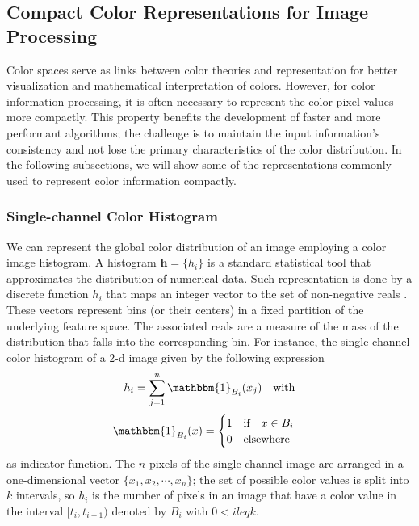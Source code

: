 \subsection{Compact Color Representations for Image Processing}

Color spaces serve as links between color theories and representation for better visualization and mathematical interpretation of colors. However, for color information processing, it is often necessary to represent the color pixel values more compactly. This property benefits the development of faster and more performant algorithms; the challenge is to maintain the input information's consistency and not lose the primary characteristics of the color distribution. In the following subsections, we will show some of the representations commonly used to represent color information compactly.

\subsubsection{Single-channel Color Histogram}
We can represent the global color distribution of an image employing a color image histogram. A histogram $\mathbf{h}= \{h_i\}$ is a standard statistical tool that approximates the distribution of numerical data. Such representation is done by a discrete function $h_i$ that maps an integer vector to the set of non-negative reals \citep{Scott:Book:2008}. These vectors represent bins (or their centers) in a fixed partition of the underlying feature space. The associated reals are a measure of the mass of the distribution that falls into the corresponding bin. For instance, the single-channel color histogram of a 2-d image given by the following expression
\begin{equation}\label{eq:single_channel_histogram}
    h_i = \sum_{j=1}^{n}  \mathbbm{1}_{B_i}(x_j) \quad \textrm{with} 
\end{equation}
\begin{equation}\nonumber
    \mathbbm{1}_{B_i}(x) = 
    \begin{cases} 
      1 \quad \textrm{if} \quad x \in B_i \\
      0 \quad \textrm{elsewhere}        
   	 \end{cases} 
\end{equation}
as indicator function. The $n$ pixels of the single-channel image are arranged in a one-dimensional vector $\{x_1, x_2, \cdots, x_n\}$; the set of possible color values is split into $k$ intervals, so $h_i$ is the number of pixels in an image that have a color value in the interval $[t_i, t_{i+1})$ denoted by $B_i$ with $0 < i leq k$.

